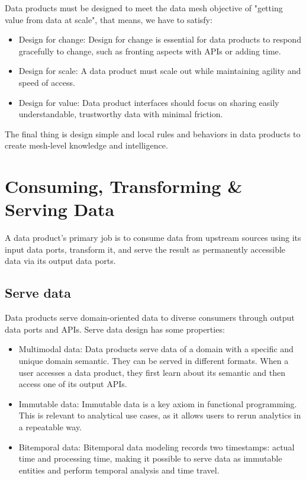 \documentclass[12pt, a4paper]{book}
\begin{document}
Data products must be designed to meet the data mesh objective of "getting value from data at scale", that means, we have to satisfy:
	\begin{itemize}
		\item Design for change: Design for change is essential for data products to respond gracefully to change, such as fronting aspects with APIs or adding time.
		\item Design for scale: A data product must scale out while maintaining agility and speed of access.
		\item Design for value: Data product interfaces should focus on sharing easily understandable, trustworthy data with minimal friction.
	\end{itemize}

The final thing is design simple and local rules and behaviors in data products to create mesh-level knowledge and intelligence.

\section{Consuming, Transforming \& Serving Data}
A data product’s primary job is to consume data from upstream sources using its input data ports, transform it, and serve the result as permanently accessible data via its output data ports.

\subsection{Serve data}
Data products serve domain-oriented data to diverse consumers through output data ports and APIs. Serve data design has some properties:
	\begin{itemize}
		\item Multimodal data: Data products serve data of a domain with a specific and unique domain semantic. They can be served in different formats. When a user accesses a data product, they first learn about its semantic and then access one of its output APIs.
		\item Immutable data: Immutable data is a key axiom in functional programming. This is relevant to analytical use cases, as it allows users to rerun analytics in a repeatable way.
		\item Bitemporal data: Bitemporal data modeling records two timestamps: actual time and processing time, making it possible to serve data as immutable entities and perform temporal analysis and time travel.
	\end{itemize}
\end{document}
